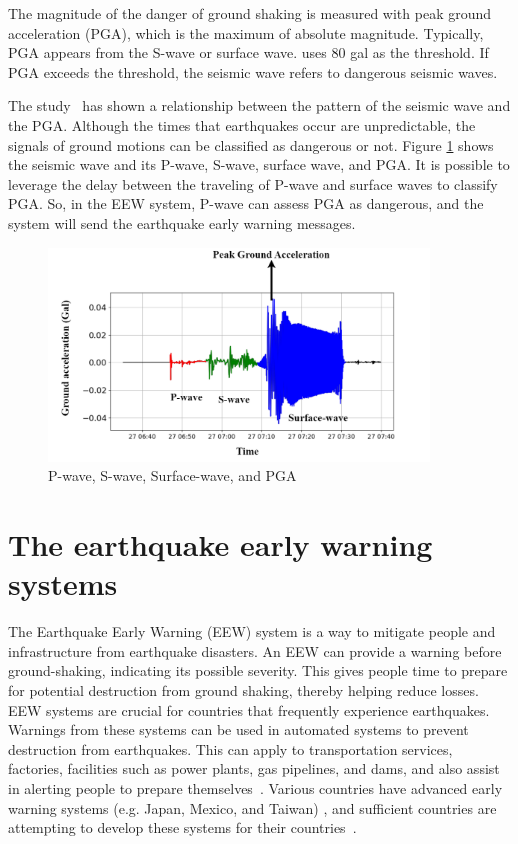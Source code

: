 The magnitude of the danger of ground shaking is measured with peak ground acceleration (PGA), which is the maximum of absolute magnitude. Typically, PGA appears from the S-wave or surface wave. \cite{chiang2022neural} uses 80 gal as the threshold. If PGA exceeds the threshold, the seismic wave refers to dangerous seismic waves.

The study~\cite{gasparini2007earthquake} has shown a relationship between the pattern of the seismic wave and the PGA. Although the times that earthquakes occur are unpredictable, the signals of ground motions can be classified as dangerous or not\cite{salam2021earthquake}. Figure \ref{fig:p-wave} shows the seismic wave and its P-wave, S-wave, surface wave, and PGA. It is possible to leverage the delay between the traveling of P-wave and surface waves to classify PGA. So, in the EEW system, P-wave can assess PGA as dangerous, and the system will send the earthquake early warning messages.

\begin{figure}[ht]
    \centering
    \includegraphics[width=0.9\textwidth]{img/p-wave.png}
    \caption{P-wave, S-wave, Surface-wave, and PGA}
    \label{fig:p-wave}
\end{figure}

\section{The earthquake early warning systems}
The Earthquake Early Warning (EEW) system is a way to mitigate people and infrastructure from earthquake disasters. An EEW can provide a warning before ground-shaking, indicating its possible severity. This gives people time to prepare for potential destruction from ground shaking, thereby helping reduce losses. EEW systems are crucial for countries that frequently experience earthquakes. Warnings from these systems can be used in automated systems to prevent destruction from earthquakes. This can apply to transportation services, factories, facilities such as power plants, gas pipelines, and dams, and also assist in alerting people to prepare themselves~\cite{gasparini2007earthquake, allen2019earthquake}. Various countries have advanced early warning systems (e.g. Japan, Mexico, and Taiwan) \cite{gasparini2007earthquake, hsiao2009development}, and sufficient countries are attempting to develop these systems for their countries~\cite{gasparini2007earthquake, allen2019earthquake}.

